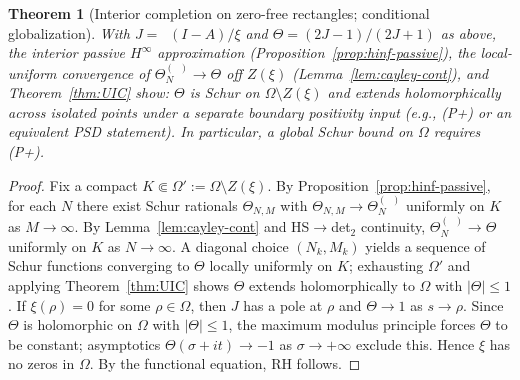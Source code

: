\documentclass[11pt]{article}
\newtheorem{theorem}{Theorem}
\theoremstyle{definition}
\theoremstyle{remark}
\DeclareMathOperator{\dettwo}{det_2}
\begin{document}
\begin{theorem}[Interior completion on zero-free rectangles; conditional globalization]\label{thm:interior-completion}
With \(J=\dettwo(I-A)/\xi\) and \(\Theta=(2J-1)/(2J+1)\) as above, the interior passive \(H^\infty\) approximation (Proposition~\ref{prop:hinf-passive}), the local-uniform convergence of \(\Theta_N^{(\dettwo)}\to\Theta\) off \(Z(\xi)\) (Lemma~\ref{lem:cayley-cont}), and Theorem~\ref{thm:UIC} show: \(\Theta\) is Schur on \(\Omega\setminus Z(\xi)\) and extends holomorphically across isolated points under a separate boundary positivity input (e.g., (P+) or an equivalent PSD statement). In particular, a global Schur bound on \(\Omega\) requires (P+). 
\end{theorem}
\begin{proof}
Fix a compact \(K\Subset\Omega':=\Omega\setminus Z(\xi)\). By Proposition~\ref{prop:hinf-passive}, for each \(N\) there exist Schur rationals \(\Theta_{N,M}\) with \(\Theta_{N,M}\to\Theta_N^{(\dettwo)}\) uniformly on \(K\) as \(M\to\infty\). By Lemma~\ref{lem:cayley-cont} and HS\(\to\)det$_2$ continuity, \(\Theta_N^{(\dettwo)}\to\Theta\) uniformly on \(K\) as \(N\to\infty\). A diagonal choice \((N_k,M_k)\) yields a sequence of Schur functions converging to \(\Theta\) locally uniformly on \(K\); exhausting \(\Omega'\) and applying Theorem~\ref{thm:UIC} shows \(\Theta\) extends holomorphically to \(\Omega\) with \(|\Theta|\le 1\).
If \(\xi(\rho)=0\) for some \(\rho\in\Omega\), then \(J\) has a pole at \(\rho\) and \(\Theta\to 1\) as \(s\to\rho\). Since \(\Theta\) is holomorphic on \(\Omega\) with \(|\Theta|\le 1\), the maximum modulus principle forces \(\Theta\) to be constant; asymptotics \(\Theta(\sigma+it)\to -1\) as \(\sigma\to+\infty\) exclude this. Hence \(\xi\) has no zeros in \(\Omega\). By the functional equation, RH follows.
\end{proof}
\end{document}
